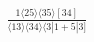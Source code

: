 \documentclass[varwidth, border=5pt]{standalone}
\begin{document}
\begin{my}
$\begin{gathered}
\scriptscriptstyle\frac{1⟨25⟩⟨35⟩[34]}{⟨13⟩⟨34⟩⟨3|1+5|3]}
\end{gathered}$
\end{my}
\end{document}
